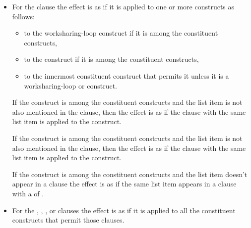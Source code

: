 \begin{itemize}
\item For the  clause the effect is as if it is applied to one or more
constructs as follows:

\begin{itemize}

\item to the worksharing-loop construct if it is among the constituent constructs,

\item to the  construct if it is among the constituent constructs,

\item to the innermost constituent construct that permits it unless it is a
worksharing-loop or  construct.
\end{itemize}

If the  construct is among the constituent constructs and the
list item is not also mentioned in the  clause, then the effect is as
if the  clause with the same list item is applied to the  construct.

If the  construct is among the constituent constructs and the
list item is not also mentioned in the  clause, then the effect is as
if the  clause with the same list item is applied to the  construct.

If the  construct is among the constituent constructs and the list item doesn't
appear in a  clause the effect is as if the same list item appears in a  clause
with a  of .

\item For the , , , or  clauses the effect is as if it is applied to all
the constituent constructs that permit those clauses.



\end{itemize}

